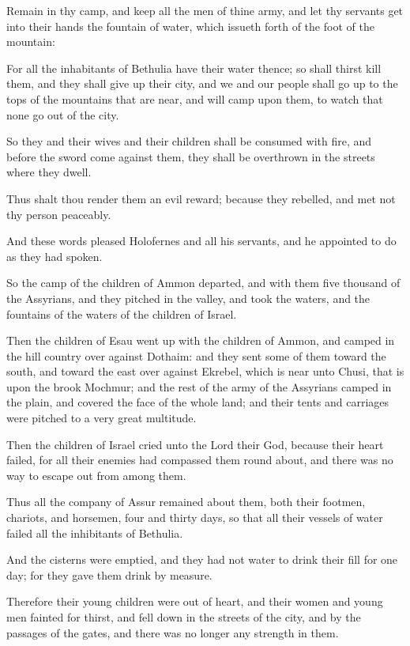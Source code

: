 {\par }{\PP {}Remain in thy camp, and keep all the men of thine army, and let thy servants get into their hands the fountain of water, which issueth forth of the foot of the mountain:
\par }{\PP {}For all the inhabitants of Bethulia have their water thence; so shall thirst kill them, and they shall give up their city, and we and our people shall go up to the tops of the mountains that are near, and will camp upon them, to watch that none go out of the city.
\par }{\PP {}So they and their wives and their children shall be consumed with fire, and before the sword come against them, they shall be overthrown in the streets where they dwell.
\par }{\PP {}Thus shalt thou render them an evil reward; because they rebelled, and met not thy person peaceably.
\par }{\PP {}And these words pleased Holofernes and all his servants, and he appointed to do as they had spoken.
\par }{\PP {}So the camp of the children of Ammon departed, and with them five thousand of the Assyrians, and they pitched in the valley, and took the waters, and the fountains of the waters of the children of Israel.
\par }{\PP {}Then the children of Esau went up with the children of Ammon, and camped in the hill country over against Dothaim: and they sent some of them toward the south, and toward the east over against Ekrebel, which is near unto Chusi, that is upon the brook Mochmur; and the rest of the army of the Assyrians camped in the plain, and covered the face of the whole land; and their tents and carriages were pitched to a very great multitude.
\par }{\PP {}Then the children of Israel cried unto the Lord their God, because their heart failed, for all their enemies had compassed them round about, and there was no way to escape out from among them.
\par }{\PP {}Thus all the company of Assur remained about them, both their footmen, chariots, and horsemen, four and thirty days, so that all their vessels of water failed all the inhibitants of Bethulia.
\par }{\PP {}And the cisterns were emptied, and they had not water to drink their fill for one day; for they gave them drink by measure.
\par }{\PP {}Therefore their young children were out of heart, and their women and young men fainted for thirst, and fell down in the streets of the city, and by the passages of the gates, and there was no longer any strength in them.
}
